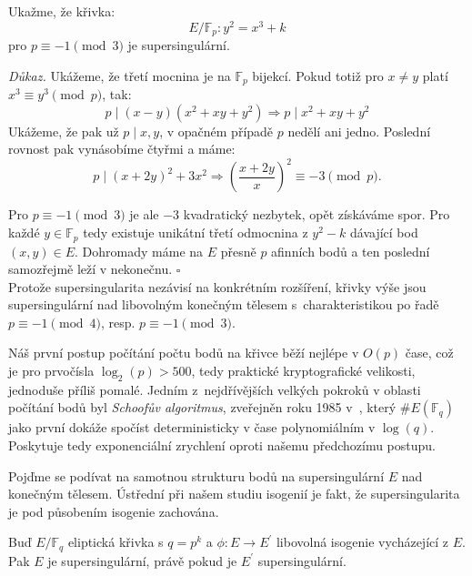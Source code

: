 \documentclass[12pt]{report}
\begin{document}
\begin{priklad}
Ukažme, že křivka:
 $$E/\mathbb{F}_p : y^2 = x^3 + k$$
pro $ p \equiv -1 \pmod{3}$ je supersingulární.
\end{priklad}
\noindent \textit{Důkaz.} Ukážeme, že třetí mocnina je na $\mathbb{F}_p$ bijekcí. Pokud totiž pro $x \neq y$ platí $x^3 \equiv y^3 \pmod{p}$, tak:
\begin{equation*}
p \mid (x-y)(x^2+xy+y^2) \Rightarrow p \mid x^2+xy+y^2 
\end{equation*}
Ukážeme, že pak už $p \mid x,y$, v opačném případě $p$ nedělí ani jedno. Poslední rovnost pak vynásobíme čtyřmi a máme:
\begin{equation*}
p \mid (x+2y)^2 + 3 x^2 \Rightarrow \left(\frac{x+2y}{x} \right)^2 \equiv -3 \pmod{p}.
\end{equation*}

Pro $p \equiv -1 \pmod{3}$ je ale $-3$ kvadratický nezbytek, opět získáváme spor. Pro každé $y \in \mathbb{F}_p$ tedy existuje unikátní třetí odmocnina z $y^2 - k$ dávající bod $(x,y) \in E$. Dohromady máme na $E$ přesně $p$ afinních bodů a ten poslední samozřejmě leží v nekonečnu. \hfill $\square$\\

Protože supersingularita nezávisí na konkrétním rozšíření, křivky výše jsou supersingulární nad libovolným konečným tělesem s~charakteristikou po řadě $p \equiv -1 \pmod{4}$, resp. $p \equiv -1 \pmod{3}$.

Náš první postup počítání počtu bodů na křivce běží nejlépe v $O(p)$ čase, což je pro prvočísla  $\log_2(p) > 500$, tedy praktické kryptografické velikosti, jednoduše příliš pomalé. Jedním z~nejdřívějších velkých pokroků v oblasti počítání bodů byl \textit{Schoofův algoritmus}, zveřejněn roku 1985 v~\cite{Schoof}, který $\# E(\mathbb{F}_q)$ jako první dokáže spočíst deterministicky v čase polynomiálním v $\log(q)$. Poskytuje tedy exponenciální zrychlení oproti našemu předchozímu postupu.

Pojďme se podívat na samotnou strukturu bodů na supersingulární $E$ nad konečným tělesem. Ústřední při našem studiu isogenií je fakt, že supersingularita je pod působením isogenie zachována. 

\begin{veta}
Buď $E/\mathbb{F}_q$ eliptická křivka s $q = p^k$ a $\phi : E \longrightarrow E^\prime$ libovolná isogenie vycházející z $E$. Pak $E$ je supersingulární, právě pokud je $E^\prime$ supersingulární.
\end{veta}
\end{document}
